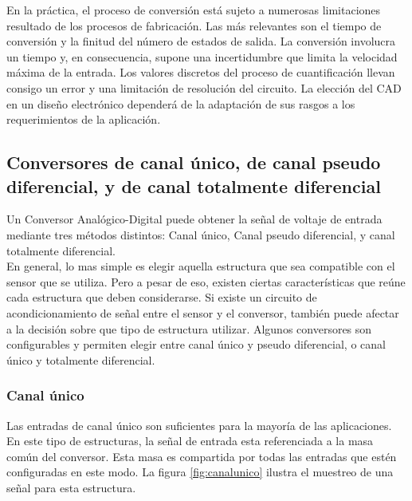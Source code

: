 En la práctica, el proceso de conversión está sujeto a numerosas limitaciones resultado de los procesos de fabricación. Las más relevantes son el tiempo de conversión y la finitud del número de estados de salida. La conversión involucra un tiempo y, en consecuencia, supone  una  incertidumbre  que  limita  la  velocidad  máxima  de  la  entrada.  Los  valores discretos  del  proceso  de  cuantificación  llevan  consigo  un  error  y  una  limitación  de resolución del circuito. La elección del CAD en un diseño electrónico dependerá de la adaptación de sus rasgos a  los requerimientos de la aplicación. \cite{delta_sigma_1}




\subsection{Conversores de canal único, de canal pseudo diferencial, y de canal totalmente diferencial}
\label{sub:conversores_de_canal_unico_de_canal_pseudo_balanceado_y_de_canal_totalmente_balanceado}

Un Conversor Analógico-Digital puede obtener la señal de voltaje de entrada mediante tres métodos distintos: Canal único, Canal pseudo diferencial, y canal totalmente diferencial. \\

En general, lo mas simple es elegir aquella estructura que sea compatible con el sensor que se utiliza. Pero a pesar de eso, existen ciertas características que reúne cada estructura que deben considerarse. Si existe un circuito de acondicionamiento de señal entre el sensor y el conversor, también puede afectar a la decisión sobre que tipo de estructura utilizar. Algunos conversores son configurables y permiten elegir entre canal único y pseudo diferencial, o canal único y totalmente diferencial.\cite{}

\subsubsection{Canal único}
\label{subs:canal_unico}

Las entradas de canal único son suficientes para la mayoría de las aplicaciones. En este tipo de estructuras, la señal de entrada esta referenciada a la masa común del conversor. Esta masa es compartida por todas las entradas que estén configuradas en este modo. La figura \ref{fig:canalunico} ilustra el muestreo de una señal para esta estructura.

